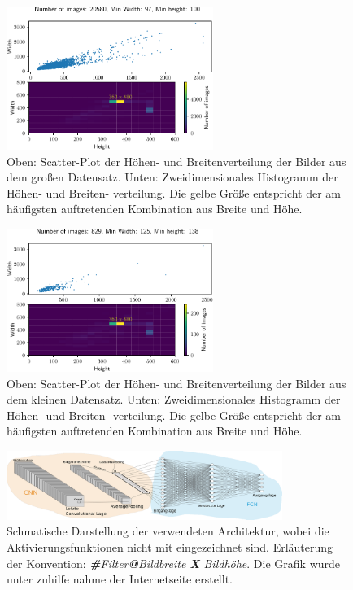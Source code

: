 \begin{figure}
\centering
\includegraphics[width=0.6\textwidth]{../../final_data/MiniNN_n120/width_heigt_scatter_hist2d.pdf}
\caption{Oben: Scatter-Plot der Höhen- und Breitenverteilung der Bilder aus dem
großen Datensatz. Unten: Zweidimensionales Histogramm der Höhen- und Breiten-
verteilung. Die gelbe Größe entspricht der am häufigsten auftretenden Kombination
aus Breite und Höhe.}
\label{fig:Bildverteilung_Datensatz}
\end{figure}
\begin{figure}
\centering
\includegraphics[width=0.6\textwidth]{../../final_data/MiniNN_n5/width_heigt_scatter_hist2d.pdf}
\caption{Oben: Scatter-Plot der Höhen- und Breitenverteilung der Bilder aus dem
kleinen Datensatz. Unten: Zweidimensionales Histogramm der Höhen- und Breiten-
verteilung. Die gelbe Größe entspricht der am häufigsten auftretenden Kombination
aus Breite und Höhe.}
\label{fig:Bildverteilung_Datensatz_MiniDataset}
\end{figure}

\begin{figure}
\centering
\includegraphics[width=0.8\textwidth]{../../final_data/general/sample_network.pdf}
\caption{Schmatische Darstellung der verwendeten Architektur, wobei
         die Aktivierungsfunktionen nicht mit eingezeichnet sind. Erläuterung der Konvention: \emph{\textbf{\#}Filter\textbf{@}Bildbreite \textbf{X} Bildhöhe}.
         Die Grafik wurde unter zuhilfe nahme der Internetseite \cite{net_svg_source} erstellt.}
\label{fig:beispielhafte_netz_architecture}
\end{figure}


